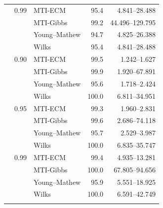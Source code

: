 \begin{longtable}{@{}rrlrr@{}}
\addlinespace[0.3em]
500 & 0.99 & MTI-ECM & 95.4 & 4.841--28.488 \\
 &  & MTI-Gibbs & 99.2 & 44.496--129.795 \\
 &  & Young--Mathew & 94.7 & 4.825--26.388 \\
 &  & Wilks & 95.4 & 4.841--28.488 \\
\addlinespace[0.3em]
1000 & 0.90 & MTI-ECM & 99.5 & 1.242--1.627 \\
 &  & MTI-Gibbs & 99.9 & 1.920--67.891 \\
 &  & Young--Mathew & 95.6 & 1.718--2.424 \\
 &  & Wilks & 100.0 & 6.811--34.951 \\
\addlinespace[0.3em]
1000 & 0.95 & MTI-ECM & 99.3 & 1.960--2.831 \\
 &  & MTI-Gibbs & 99.6 & 2.686--74.118 \\
 &  & Young--Mathew & 95.7 & 2.529--3.987 \\
 &  & Wilks & 100.0 & 6.835--35.747 \\
\addlinespace[0.3em]
1000 & 0.99 & MTI-ECM & 99.4 & 4.935--13.281 \\
 &  & MTI-Gibbs & 100.0 & 67.805--94.656 \\
 &  & Young--Mathew & 95.9 & 5.551--18.925 \\
 &  & Wilks & 100.0 & 6.591--42.749 \\
\addlinespace[0.3em]
\end{longtable}
\endgroup
